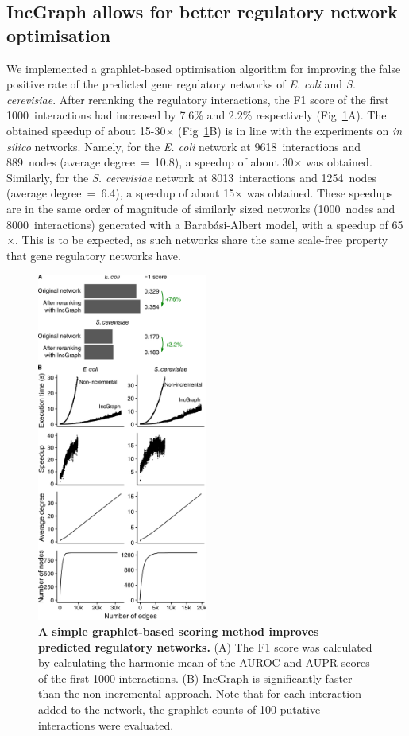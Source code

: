 \subsection*{IncGraph allows for better regulatory network optimisation}
We implemented a graphlet-based optimisation algorithm for improving the false positive rate of the predicted gene regulatory networks of \textit{E. coli} and \textit{S. cerevisiae}. After reranking the regulatory interactions, the F1 score of the first 1000~interactions had increased by 7.6\% and 2.2\% respectively (Fig~\ref{fig_reranking}A). The obtained speedup of about 15-30$\times$ (Fig~\ref{fig_reranking}B) is in line with the experiments on \textit{in silico} networks.
Namely, for the \textit{E. coli} network at 9618~interactions and 889~nodes (average degree~=~10.8), a speedup of about 30$\times$ was obtained.
Similarly, for the \textit{S. cerevisiae} network at 8013~interactions and 1254~nodes (average degree~=~6.4), a speedup of about 15$\times$ was obtained.
These speedups are in the same order of magnitude of similarly sized networks (1000~nodes and 8000~interactions) generated with a Barab\'asi-Albert model, with a speedup of 65$\times$. This is to be expected, as such networks share the same scale-free property that gene regulatory networks have.


\begin{figure}[ht!]
	\centering
	\includegraphics[width=0.5\textwidth]{fig/figure6.png}
	\caption{{\bf A simple graphlet-based scoring method improves predicted regulatory networks.}
		(A) The F1 score was calculated by calculating the harmonic mean of the AUROC and AUPR scores of the first 1000 interactions. (B) IncGraph is significantly faster than the non-incremental approach. Note that for each interaction added to the network, the graphlet counts of 100 putative interactions were evaluated.}
	\label{fig_reranking}
\end{figure}

